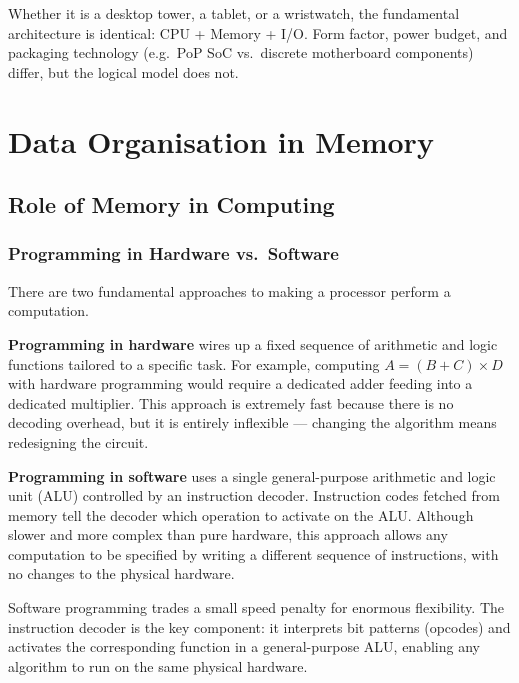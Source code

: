 \documentclass[11pt, a4paper, notitlepage]{report}
\theoremstyle{definition}
\theoremstyle{remark}
\theoremstyle{definition}
\begin{document}
\begin{keyresult}[title={Same Abstraction, Different Packaging}]
Whether it is a desktop tower, a tablet, or a wristwatch, the fundamental architecture is identical: CPU + Memory + I/O\@. Form factor, power budget, and packaging technology (e.g.\ PoP SoC vs.\ discrete motherboard components) differ, but the logical model does not.
\end{keyresult}

\chapter{Data Organisation in Memory}

\section{Role of Memory in Computing}

\subsection{Programming in Hardware vs.\ Software}

There are two fundamental approaches to making a processor perform a computation.

\textbf{Programming in hardware} wires up a fixed sequence of arithmetic and logic functions tailored to a specific task. For example, computing $A = (B+C)\times D$ with hardware programming would require a dedicated adder feeding into a dedicated multiplier. This approach is extremely fast because there is no decoding overhead, but it is entirely inflexible --- changing the algorithm means redesigning the circuit.

\textbf{Programming in software} uses a single general-purpose arithmetic and logic unit (ALU) controlled by an instruction decoder. Instruction codes fetched from memory tell the decoder which operation to activate on the ALU\@. Although slower and more complex than pure hardware, this approach allows any computation to be specified by writing a different sequence of instructions, with no changes to the physical hardware.

\begin{keyresult}[title={Why Software Wins}]
Software programming trades a small speed penalty for enormous flexibility. The instruction decoder is the key component: it interprets bit patterns (opcodes) and activates the corresponding function in a general-purpose ALU, enabling any algorithm to run on the same physical hardware.
\end{keyresult}
\end{document}
